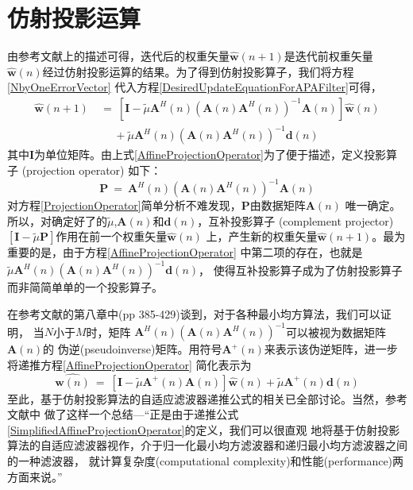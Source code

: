 \section{仿射投影运算}
由参考文献上的描述可得，迭代后的权重矢量$\hat{\mathbf{w}}(n+1)$是迭代前权重矢量
$\hat{\mathbf{w}}(n)$经过仿射投影运算的结果。为了得到仿射投影算子，我们将方程\eqref{NbyOneErrorVector}
代入方程\eqref{DesiredUpdateEquationForAPAFilter}可得，
\begin{equation}
\label{AffineProjectionOperator}
\begin{split}
    \hat{\mathbf{w}}(n+1)& ~=~ [\mathbf{I}-\tilde{\mu}
    \mathbf{A}^{H}(n)(\mathbf{A}(n)\mathbf{A}^{H}(n))^{-1}
    \mathbf{A}(n)]\hat{\mathbf{w}}(n) \\
    & \quad~~+ \tilde{\mu}\mathbf{A}^{H}(n)(\mathbf{A}(n)\mathbf{A}^{H}(n))^{-1}
    \mathbf{d}(n)
\end{split}
\end{equation}
其中$\mathbf{I}$为单位矩阵。由上式\eqref{AffineProjectionOperator}为了便于描述，定义投影算子 (projection operator)
如下：
\begin{equation}\label{ProjectionOperator}
    \mathbf{P}~=~\mathbf{A}^{H}(n)(\mathbf{A}(n)\mathbf{A}^{H}(n))^{-1}
    \mathbf{A}(n)
\end{equation}
对方程\eqref{ProjectionOperator}简单分析不难发现，$\mathbf{P}$由数据矩阵$\mathbf{A}(n)$
唯一确定。所以，对确定好了的$\tilde{\mu}$,$\mathbf{A}(n)$和$\mathbf{d}(n)$，互补投影算子
(complement projector)~$[\mathbf{I}-\tilde{\mu}\mathbf{P}]$作用在前一个权重矢量$\hat{\mathbf{w}}(n)$
上，产生新的权重矢量$\hat{\mathbf{w}}(n+1)$。最为重要的是，由于方程\eqref{AffineProjectionOperator}
中第二项的存在，也就是$\tilde{\mu}\mathbf{A}^{H}(n)(\mathbf{A}(n)\mathbf{A}^{H}(n))^{-1}\mathbf{d}(n)$，
使得互补投影算子成为了仿射投影算子而非简简单单的一个投影算子。
\par
在参考文献的第八章中(pp 385-429)谈到，对于各种最小均方算法，我们可以证明，
当$N$小于$M$时，矩阵
$\mathbf{A}^{H}(n)(\mathbf{A}(n)\mathbf{A}^{H}(n))^{-1}$可以被视为数据矩阵$\mathbf{A}(n)$的
伪逆(pseudoinverse)矩阵。用符号$\mathbf{A}^{+}(n)$来表示该伪逆矩阵，进一步将递推方程\eqref{AffineProjectionOperator}
简化表示为
\begin{equation}\label{SimplifiedAffineProjectionOperator}
    \hat{\mathbf{w}(n)}~=~[\mathbf{I}-\tilde{\mu}\mathbf{A}^{+}(n)\mathbf{A}(n)]
    \hat{\mathbf{w}}(n) + \tilde{\mu}\mathbf{A}^{+}(n)\mathbf{d}(n)
\end{equation}
至此，基于仿射投影算法的自适应滤波器递推公式的相关已全部讨论。当然，参考文献中
做了这样一个总结---“正是由于递推公式\eqref{SimplifiedAffineProjectionOperator}的定义，我们可以很直观
地将基于仿射投影算法的自适应滤波器视作，介于归一化最小均方滤波器和递归最小均方滤波器之间的一种滤波器，
就计算复杂度(computational complexity)和性能(performance)两方面来说。”

